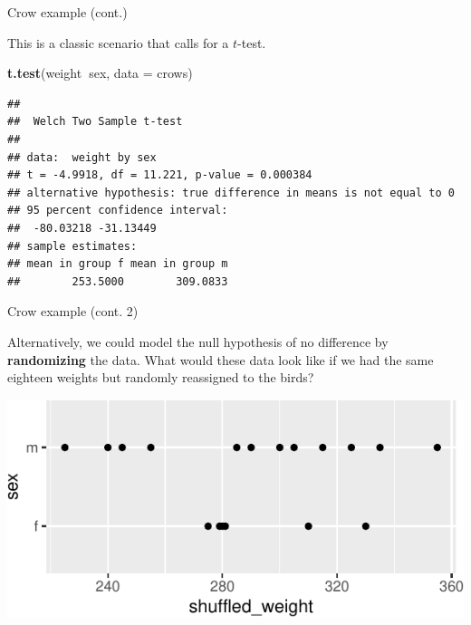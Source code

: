 \documentclass[
  ignorenonframetext,
]{beamer}
\newenvironment{Shaded}{\begin{snugshade}}{\end{snugshade}}
\newcommand{\DataTypeTok}[1]{\textcolor[rgb]{0.13,0.29,0.53}{#1}}
\newcommand{\KeywordTok}[1]{\textcolor[rgb]{0.13,0.29,0.53}{\textbf{#1}}}
\newcommand{\NormalTok}[1]{#1}
\newcommand{\OperatorTok}[1]{\textcolor[rgb]{0.81,0.36,0.00}{\textbf{#1}}}
\newcommand{\StringTok}[1]{\textcolor[rgb]{0.31,0.60,0.02}{#1}}
\begin{document}
\begin{frame}[fragile]{Crow example (cont.)}
\protect\hypertarget{crow-example-cont.}{}

This is a classic scenario that calls for a \(t\)-test.

\begin{Shaded}
\begin{Highlighting}[]
\KeywordTok{t.test}\NormalTok{(weight}\OperatorTok{~}\NormalTok{sex, }\DataTypeTok{data =}\NormalTok{ crows)}
\end{Highlighting}
\end{Shaded}

\begin{verbatim}
## 
##  Welch Two Sample t-test
## 
## data:  weight by sex
## t = -4.9918, df = 11.221, p-value = 0.000384
## alternative hypothesis: true difference in means is not equal to 0
## 95 percent confidence interval:
##  -80.03218 -31.13449
## sample estimates:
## mean in group f mean in group m 
##        253.5000        309.0833
\end{verbatim}

\end{frame}

\begin{frame}[fragile]{Crow example (cont. 2)}
\protect\hypertarget{crow-example-cont.-2}{}

Alternatively, we could model the null hypothesis of no difference by
\textbf{randomizing} the data. What would these data look like if we had
the same eighteen weights but randomly reassigned to the birds?

\scriptsize

\begin{Shaded}
\end{Shaded}

\includegraphics{simulation_files/figure-beamer/unnamed-chunk-6-1.pdf}

\end{frame}
\end{document}
